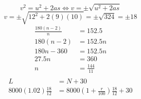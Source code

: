 \documentclass[]{article}
\begin{document}
\[v^2=u^2+2as\iff v=\pm\sqrt{u^2+2as}\]
\[v=\pm\sqrt{12^2+2(9)(10)}=\pm\sqrt{324}=\pm18\]
\[\begin{aligned}
    \frac{180(n-2)}n&=152.5\\
    180(n-2)&=152.5n\\
    180n-360&=152.5n\\
    27.5n&=360\\
    n&=\frac{144}{11}\\
\end{aligned}\]
\[\begin{aligned}
    L&=N+30\\
    8000(1.02)\frac{18}{12}&=8000\left(1+\frac{r}{100}\right)\frac{18}{12}+30\\
\end{aligned}\]
\end{document}
